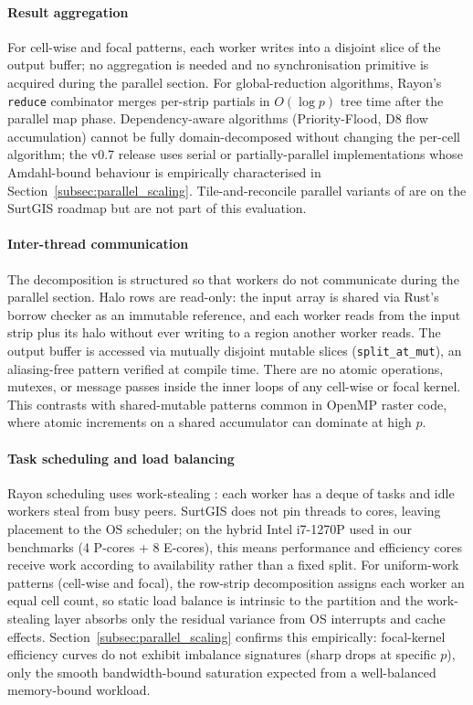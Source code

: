 \documentclass[preprint,review,12pt,authoryear]{elsarticle}
\begin{document}
\paragraph{Result aggregation} For cell-wise and focal patterns, each worker writes into a disjoint slice of the output buffer; no aggregation is needed and no synchronisation primitive is acquired during the parallel section. For global-reduction algorithms, Rayon's \texttt{reduce} combinator merges per-strip partials in $O(\log p)$ tree time after the parallel map phase. Dependency-aware algorithms (Priority-Flood, D8 flow accumulation) cannot be fully domain-decomposed without changing the per-cell algorithm; the v0.7 release uses serial or partially-parallel implementations whose Amdahl-bound behaviour is empirically characterised in Section~\ref{subsec:parallel_scaling}. Tile-and-reconcile parallel variants of \citet{barnes2017} are on the SurtGIS roadmap but are not part of this evaluation.

\paragraph{Inter-thread communication} The decomposition is structured so that workers do not communicate during the parallel section. Halo rows are read-only: the input array is shared via Rust's borrow checker as an immutable reference, and each worker reads from the input strip plus its halo without ever writing to a region another worker reads. The output buffer is accessed via mutually disjoint mutable slices (\texttt{split\_at\_mut}), an aliasing-free pattern verified at compile time. There are no atomic operations, mutexes, or message passes inside the inner loops of any cell-wise or focal kernel. This contrasts with shared-mutable patterns common in OpenMP raster code, where atomic increments on a shared accumulator can dominate at high $p$.

\paragraph{Task scheduling and load balancing} Rayon scheduling uses work-stealing \citep{blumofe1999}: each worker has a deque of tasks and idle workers steal from busy peers. SurtGIS does not pin threads to cores, leaving placement to the OS scheduler; on the hybrid Intel i7-1270P used in our benchmarks (4 P-cores + 8 E-cores), this means performance and efficiency cores receive work according to availability rather than a fixed split. For uniform-work patterns (cell-wise and focal), the row-strip decomposition assigns each worker an equal cell count, so static load balance is intrinsic to the partition and the work-stealing layer absorbs only the residual variance from OS interrupts and cache effects. Section~\ref{subsec:parallel_scaling} confirms this empirically: focal-kernel efficiency curves do not exhibit imbalance signatures (sharp drops at specific $p$), only the smooth bandwidth-bound saturation expected from a well-balanced memory-bound workload.
\end{document}
